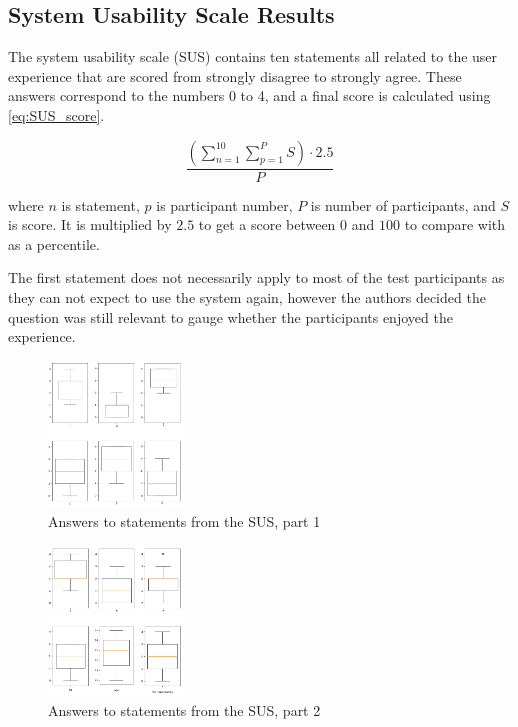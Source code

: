 \graphicspath{{fake_results/}}
\subsection{System Usability Scale Results}

The system usability scale (SUS) contains ten statements all related to the user experience that are scored from strongly disagree to strongly agree. These answers correspond to the numbers 0 to 4, and a final score is calculated using \autoref{eq:SUS_score}.

\begin{equation}
	\frac{(\sum\limits_{n=1}^{10} \sum\limits_{p=1}^{P} S) \cdot 2.5 }{P}
	\label{eq:SUS_score}
\end{equation}

where $ n $ is statement, $ p $ is participant number, $ P $ is number of participants, and $ S $ is score. It is multiplied by $2.5$ to get a score between $ 0 $ and $ 100 $ to compare with as a percentile. %

The first statement does not necessarily apply to most of the test participants as they can not expect to use the system again, however the authors decided the question was still relevant to gauge whether the participants enjoyed the experience. 

\begin{figure}
\centering
\includegraphics[width=0.32\textwidth]{Page1.png}
\caption{Answers to statements from the SUS, part 1}
\label{fig:one}
\end{figure}

\begin{figure}
\centering
\includegraphics[width=0.32\textwidth]{Page2.png}
\caption{Answers to statements from the SUS, part 2}
\label{fig:two}
\end{figure}

